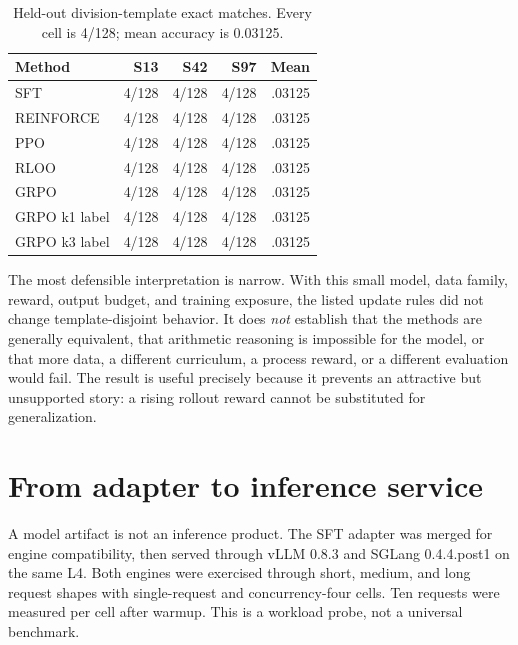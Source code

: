 \documentclass[10pt]{article}
\begin{document}
\begin{table}[t]\centering\small
\caption{Held-out division-template exact matches. Every cell is 4/128; mean accuracy is 0.03125.}\label{tab:rl-results}
\begin{tabular}{lrrrr}\toprule
Method & S13 & S42 & S97 & Mean \\ \midrule
SFT & 4/128 & 4/128 & 4/128 & .03125 \\
REINFORCE & 4/128 & 4/128 & 4/128 & .03125 \\
PPO & 4/128 & 4/128 & 4/128 & .03125 \\
RLOO & 4/128 & 4/128 & 4/128 & .03125 \\
GRPO & 4/128 & 4/128 & 4/128 & .03125 \\
GRPO k1 label & 4/128 & 4/128 & 4/128 & .03125 \\
GRPO k3 label & 4/128 & 4/128 & 4/128 & .03125 \\ \bottomrule
\end{tabular}\end{table}

The most defensible interpretation is narrow. With this small model, data family, reward, output budget, and training exposure, the listed update rules did not change template-disjoint behavior. It does \emph{not} establish that the methods are generally equivalent, that arithmetic reasoning is impossible for the model, or that more data, a different curriculum, a process reward, or a different evaluation would fail. The result is useful precisely because it prevents an attractive but unsupported story: a rising rollout reward cannot be substituted for generalization.

\section{From adapter to inference service}
A model artifact is not an inference product. The SFT adapter was merged for engine compatibility, then served through vLLM 0.8.3 and SGLang 0.4.4.post1 on the same L4. Both engines were exercised through short, medium, and long request shapes with single-request and concurrency-four cells. Ten requests were measured per cell after warmup. This is a workload probe, not a universal benchmark.
\end{document}

